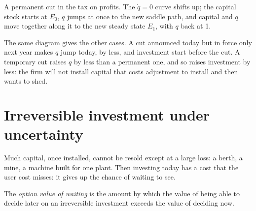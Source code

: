 \begin{omfigure}

{\small A permanent cut in the tax on profits. The $\dot q = 0$ curve shifts up; the capital stock starts at $E_0$, $q$ jumps at once to the new
saddle path, and capital and $q$ move together along it to the new steady state $E_1$, with $q$ back at 1.}
\end{omfigure}

The same diagram gives the other cases. A cut announced today but in force only next year makes $q$ jump today, by less, and
investment start before the cut. A temporary cut raises $q$ by less than a permanent one, and so raises investment by less:
the firm will not install capital that costs adjustment to install and then wants to shed.

\section{Irreversible investment under uncertainty}\label{sec:b2:investment:irreversible}

Much capital, once installed, cannot be resold except at a large loss: a berth, a mine, a machine built for one plant.
Then investing today has a cost that the user cost misses: it gives up the chance of waiting to see.

\begin{definition}\label{def:b2:investment:option-value}
The \emph{option value of waiting} is the amount by which the value of being able to
decide later on an irreversible investment exceeds the value of deciding now.
\end{definition}

